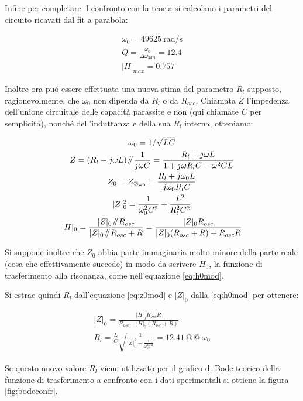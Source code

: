 \documentclass{article}
\newcommand{\pars}{\mathbin{\!/\mkern-5mu/\!}}
\begin{document}
Infine per completare il confronto con la teoria si calcolano i parametri del circuito ricavati dal fit a parabola:

\begin{gather}
	\omega_0 = 49625 \ \si{\radian\per\second} \\
	Q = \frac{\omega_0}{\Delta \omega_{\textrm{3dB}}} = 12.4 \\ 
	|H|_{max} = 0.757 
\end{gather}

Inoltre ora pu\'o essere effettuata una nuova stima del parametro $R_l$ supposto, ragionevolmente, che $\omega_0$ non dipenda da $R_l$ o da $R_{osc}$.
Chiamata $Z$ l'impedenza dell'unione circuitale delle capacità parassite e non (qui chiamate $C$ per semplicit\'a), nonch\'e dell'induttanza e della sua $R_l$ interna, otteniamo:

\begin{gather}
	\nonumber
	\omega_0=1/\sqrt{LC} \\ 
	\nonumber
	Z = (R_l + j\omega L) \pars \frac{1}{j \omega C} = \frac{R_l+j\omega L}{1+j \omega R_l C - \omega^2 C L}\\
	\nonumber
	Z_0 = Z_{@ \omega_0} =  \frac{R_l + j \omega_0 L}{j\omega_0 R_l C} \\
	\label{eq:z0mod}
	|Z|^2_{0} = \frac{1}{\omega_0^2 C^2} + \frac{L^2}{R_l^2 C^2} \\
	\label{eq:h0mod}
	|H|_{0} =\frac{|Z|_0 \pars R_{osc}}{|Z|_0 \pars R_{osc} + R} = \frac{|Z|_0 R_{osc}}{|Z|_0 (R_{osc} + R) +R_{osc} R}
\end{gather}

Si suppone inoltre che $Z_0$ abbia parte immaginaria molto minore della parte reale (cosa che effettivamente succede) in modo da scrivere $H_0$, la funzione di trasferimento alla risonanza, come nell'equazione \ref{eq:h0mod}.

Si estrae quindi $R_l$ dall'equazione \ref{eq:z0mod} e $|Z|_0$ dalla \ref{eq:h0mod} per ottenere:

\begin{gather}
	|Z|_0 = \frac{|H|_0 R_{osc} R}{R_{osc} - |H|_0 (R_{osc}+R)} \\
	\bar{R_l} = \frac{L}{C} \sqrt{\frac{1}{|Z|^2_0 - \frac{1}{\omega_0^2 C^2}}} = 12.41 \ \si{\ohm} \ @ \ \omega_0
\end{gather}

Se questo nuovo valore $\bar{R_l}$ viene utilizzato per il grafico di Bode teorico della funzione di trasferimento a confronto con i dati sperimentali si ottiene la figura \ref{fig:bodeconfr}.
\end{document}

